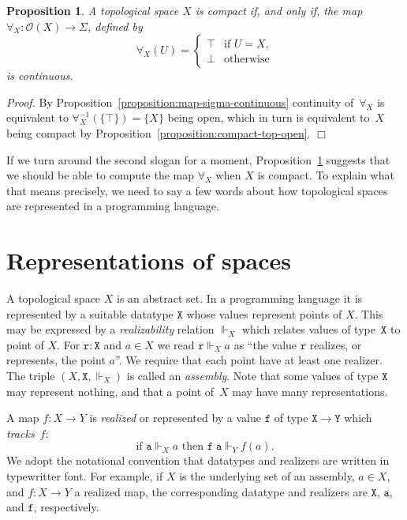 \documentclass[a4paper,10pt]{article}
\newtheorem{proposition}[theorem]{Proposition}
\newenvironment{proof}{\par\noindent\textit{Proof.}}{\hfill$\Box$\par\medskip}
\newcommand{\set}[1]{\{#1\}}
\newcommand{\tpl}[1]{\mathcal{O}(#1)}
\newcommand{\R}[1]{\mathtt{#1}}
\newcommand{\rz}{\Vdash}
\begin{document}
\begin{proposition}
  \label{proposition:compact-iff-forall-continuous}
  A topological space $X$ is compact if, and only if, the map
  $\forall_X : \tpl{X} \to \Sigma$, defined by
  \begin{equation*}
    \forall_X(U) =
    \begin{cases}
      \top & \text{if $U = X$,}\\
      \bot & \text{otherwise}
    \end{cases}    
  \end{equation*}
  is continuous.
\end{proposition}

\begin{proof}
  By Proposition~\ref{proposition:map-sigma-continuous} continuity
  of~$\forall_X$ is equivalent to $\forall_X^{-1}(\set{\top}) =
  \set{X}$ being open, which in turn is equivalent to~$X$ being
  compact by Proposition~\ref{proposition:compact-top-open}.
\end{proof}

If we turn around the second slogan for a moment,
Proposition~\ref{proposition:compact-iff-forall-continuous} suggests
that we should be able to compute the map $\forall_X$ when $X$ is
compact. To explain what that means precisely, we need to say a few
words about how topological spaces are represented in a programming
language.

\section{Representations of spaces}
\label{sec:representations}

A topological space $X$ is an abstract set. In a programming language
it is represented by a suitable datatype $\mathtt{X}$ whose values
represent points of $X$. This may be expressed by a
\emph{realizability} relation $\rz_X$ which relates values of
type~$\mathtt{X}$ to point of $X$. For $\R{r} : \mathtt{X}$ and $a \in
X$ we read $\R{r} \rz_X a$ as ``the value $\R{r}$ realizes, or
represents, the point $a$''. We require that each point have at least
one realizer. The triple $(X, \mathtt{X}, {\rz_X})$ is called an
\emph{assembly}. Note that some values of type $\mathtt{X}$ may
represent nothing, and that a point of~$X$ may have many
representations.

A map $f : X \to Y$ is \emph{realized} or represented by a value
$\R{f}$ of type $\mathtt{X} \to \mathtt{Y}$ which \emph{tracks}~$f$:
%
\begin{equation*}
  \text{if $\R{a} \rz_X a$ then $\R{f}\;\R{a} \rz_Y f(a)$.}
\end{equation*}
%
We adopt the notational convention that datatypes and realizers are written in typewritter font. For example, if $X$ is the underlying set of an assembly, $a \in X$, and $f : X \to Y$ a realized map, the corresponding datatype and realizers are $\mathtt{X}$, $\R{a}$, and $\R{f}$, respectively.
\end{document}
